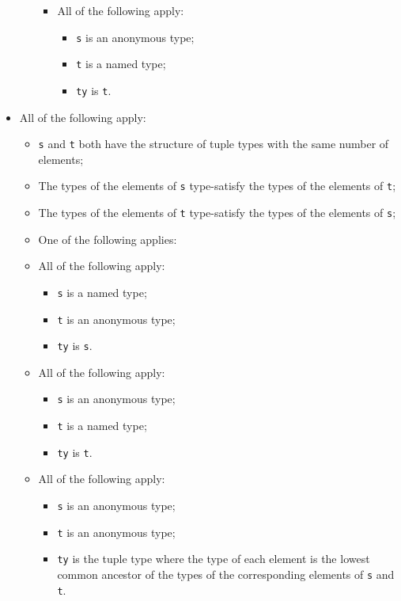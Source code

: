 \documentclass{book}
\begin{document}
\begin{itemize}
\begin{itemize}
\begin{itemize}
      \item All of the following apply:
        \begin{itemize}
        \item \texttt{s} is an anonymous type;
        \item \texttt{t} is a named type;
        \item \texttt{ty} is \texttt{t}.
        \end{itemize}
      \end{itemize}
    \end{itemize}

  \item All of the following apply:
    \begin{itemize}
    \item \texttt{s} and \texttt{t} both have the structure of tuple types with the same number of elements;
    \item The types of the elements of \texttt{s} type-satisfy the types of the elements of \texttt{t};
    \item The types of the elements of \texttt{t} type-satisfy the types of the elements of \texttt{s};
    \item One of the following applies:

      \item All of the following apply:
        \begin{itemize}
        \item \texttt{s} is a named type;
        \item \texttt{t} is an anonymous type;
        \item \texttt{ty} is \texttt{s}.
        \end{itemize}

      \item All of the following apply:
        \begin{itemize}
        \item \texttt{s} is an anonymous type;
        \item \texttt{t} is a named type;
        \item \texttt{ty} is \texttt{t}.
        \end{itemize}

     \item All of the following apply:
        \begin{itemize}
        \item \texttt{s} is an anonymous type;
        \item \texttt{t} is an anonymous type;
	\item \texttt{ty} is the tuple type where the type of each element is the lowest common
	  ancestor of the types of the corresponding elements of \texttt{s} and \texttt{t}.
        \end{itemize}
    \end{itemize}


\end{itemize}
\end{document}
